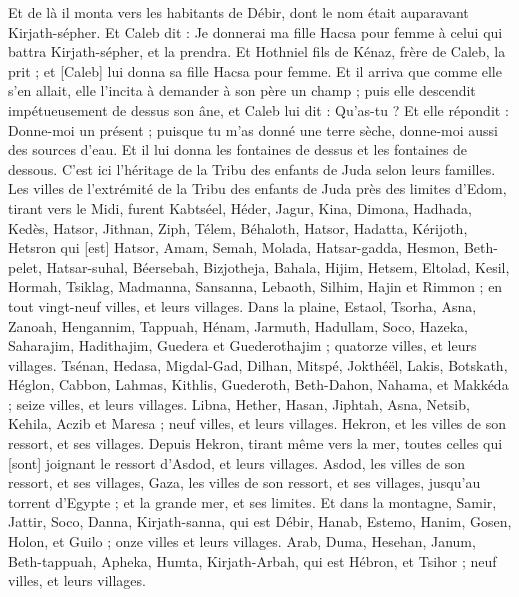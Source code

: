 \begin{multicols}{2}
Et de là il monta vers les habitants de Débir, dont le nom était auparavant Kirjath-sépher.
Et Caleb dit : Je donnerai ma fille Hacsa pour femme à celui qui battra Kirjath-sépher, et la prendra.
Et Hothniel fils de Kénaz, frère de Caleb, la prit ; et [Caleb] lui donna sa fille Hacsa pour femme.
Et il arriva que comme elle s'en allait, elle l'incita à demander à son père un champ ; puis elle descendit impétueusement de dessus son âne, et Caleb lui dit : Qu'as-tu ?
Et elle répondit : Donne-moi un présent ; puisque tu m'as donné une terre sèche, donne-moi aussi des sources d'eau. Et il lui donna les fontaines de dessus et les fontaines de dessous.
C'est ici l'héritage de la Tribu des enfants de Juda selon leurs familles.
Les villes de l'extrémité de la Tribu des enfants de Juda près des limites d'Edom, tirant vers le Midi, furent Kabtséel, Héder, Jagur,
Kina, Dimona, Hadhada,
Kedès, Hatsor, Jithnan,
Ziph, Télem, Béhaloth,
Hatsor, Hadatta, Kérijoth, Hetsron qui [est] Hatsor,
Amam, Semah, Molada,
Hatsar-gadda, Hesmon, Beth-pelet,
Hatsar-suhal, Béersebah, Bizjotheja,
Bahala, Hijim, Hetsem,
Eltolad, Kesil, Hormah,
Tsiklag, Madmanna, Sansanna,
Lebaoth, Silhim, Hajin et Rimmon ; en tout vingt-neuf villes, et leurs villages.
Dans la plaine, Estaol, Tsorha, Asna,
Zanoah, Hengannim, Tappuah, Hénam,
Jarmuth, Hadullam, Soco, Hazeka,
Saharajim, Hadithajim, Guedera et Guederothajim ; quatorze villes, et leurs villages.
Tsénan, Hedasa, Migdal-Gad,
Dilhan, Mitspé, Jokthéël,
Lakis, Botskath, Héglon,
Cabbon, Lahmas, Kithlis,
Guederoth, Beth-Dahon, Nahama, et Makkéda ; seize villes, et leurs villages.
Libna, Hether, Hasan,
Jiphtah, Asna, Netsib,
Kehila, Aczib et Maresa ; neuf villes, et leurs villages.
Hekron, et les villes de son ressort, et ses villages.
Depuis Hekron, tirant même vers la mer, toutes celles qui [sont] joignant le ressort d'Asdod, et leurs villages.
Asdod, les villes de son ressort, et ses villages, Gaza, les villes de son ressort, et ses villages, jusqu'au torrent d'Egypte ; et la grande mer, et ses limites.
Et dans la montagne, Samir, Jattir, Soco,
Danna, Kirjath-sanna, qui est Débir,
Hanab, Estemo, Hanim,
Gosen, Holon, et Guilo ; onze villes et leurs villages.
Arab, Duma, Hesehan,
Janum, Beth-tappuah, Apheka,
Humta, Kirjath-Arbah, qui est Hébron, et Tsihor ; neuf villes, et leurs villages.

\end{multicols}
